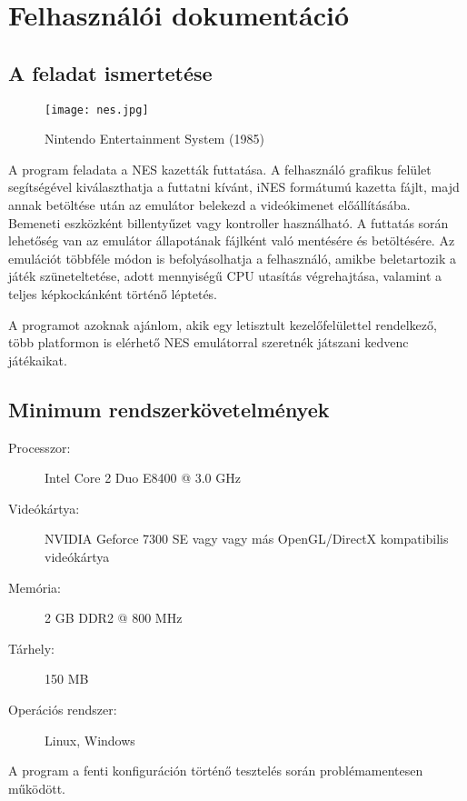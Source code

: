 \chapter{Felhasználói dokumentáció} %
\label{ch:user}

\section{A feladat ismertetése}

\begin{figure}[H]
	\centering
	\texttt{[image: nes.jpg]}
	\caption{Nintendo Entertainment System (1985)}
	\label{fig:nes}
\end{figure}

A program feladata a NES kazetták futtatása. A felhasználó grafikus felület segítségével kiválaszthatja a futtatni kívánt, iNES formátumú kazetta fájlt, majd annak betöltése után az emulátor belekezd a videókimenet előállításába. Bemeneti eszközként billentyűzet vagy kontroller használható. A futtatás során lehetőség van az emulátor állapotának fájlként való mentésére és betöltésére. Az emulációt többféle módon is befolyásolhatja a felhasználó, amikbe beletartozik a játék szüneteltetése, adott mennyiségű CPU utasítás végrehajtása, valamint a teljes képkockánként történő léptetés.

A programot azoknak ajánlom, akik egy letisztult kezelőfelülettel rendelkező, több platformon is elérhető NES emulátorral szeretnék játszani kedvenc játékaikat.

\section{Minimum rendszerkövetelmények}

\begin{description}
	\item[Processzor:] Intel Core 2 Duo E8400 @ 3.0 GHz
	\item[Videókártya:] NVIDIA Geforce 7300 SE vagy 
	\newline vagy más OpenGL/DirectX kompatibilis videókártya
	\item[Memória:] 2 GB DDR2 @ 800 MHz
	\item[Tárhely:] 150 MB
	\item[Operációs rendszer:] Linux, Windows
\end{description}

A program a fenti konfiguráción történő tesztelés során problémamentesen működött.

